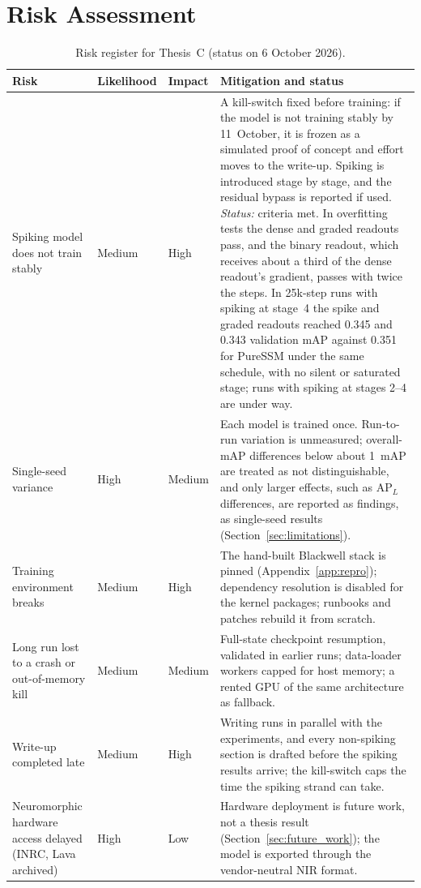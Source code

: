 \documentclass[11pt, a4paper]{report}
\begin{document}
\chapter{Risk Assessment}
\begin{table}[htbp]
    \centering
    \small
    \caption{Risk register for Thesis~C (status on 6 October 2026).}
    \label{tab:risk_assessment}
    \renewcommand{\arraystretch}{1.4}
    \begin{tabularx}{\textwidth}{|>{\RaggedRight\arraybackslash}p{3.2cm}|l|l|>{\RaggedRight\arraybackslash}X|}
        \hline
        \rowcolor[gray]{0.9} \textbf{Risk} & \textbf{Likelihood} & \textbf{Impact} & \textbf{Mitigation and status} \\ \hline
        Spiking model does not train stably & Medium & High & A kill-switch fixed before training: if the model is not training stably by 11~October, it is frozen as a simulated proof of concept and effort moves to the write-up. Spiking is introduced stage by stage, and the residual bypass is reported if used. \emph{Status:} criteria met. In overfitting tests the dense and graded readouts pass, and the binary readout, which receives about a third of the dense readout's gradient, passes with twice the steps. In 25k-step runs with spiking at stage~4 the spike and graded readouts reached 0.345 and 0.343 validation mAP against 0.351 for PureSSM under the same schedule, with no silent or saturated stage; runs with spiking at stages 2--4 are under way. \\ \hline
        Single-seed variance & High & Medium & Each model is trained once. Run-to-run variation is unmeasured; overall-mAP differences below about 1~mAP are treated as not distinguishable, and only larger effects, such as $\mathrm{AP}_L$ differences, are reported as findings, as single-seed results (Section~\ref{sec:limitations}). \\ \hline
        Training environment breaks & Medium & High & The hand-built Blackwell stack is pinned (Appendix~\ref{app:repro}); dependency resolution is disabled for the kernel packages; runbooks and patches rebuild it from scratch. \\ \hline
        Long run lost to a crash or out-of-memory kill & Medium & Medium & Full-state checkpoint resumption, validated in earlier runs; data-loader workers capped for host memory; a rented GPU of the same architecture as fallback. \\ \hline
        Write-up completed late & Medium & High & Writing runs in parallel with the experiments, and every non-spiking section is drafted before the spiking results arrive; the kill-switch caps the time the spiking strand can take. \\ \hline
        Neuromorphic hardware access delayed (INRC, Lava archived) & High & Low & Hardware deployment is future work, not a thesis result (Section~\ref{sec:future_work}); the model is exported through the vendor-neutral NIR format. \\ \hline
    \end{tabularx}
\end{table}
\end{document}
